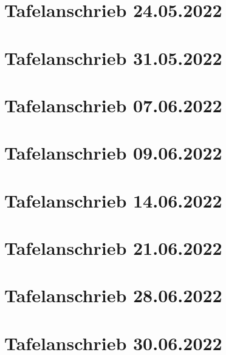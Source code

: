 \documentclass[a4paper,12pt]{article}
\begin{document}
\section{Tafelanschrieb 24.05.2022}

\newpage
\section{Tafelanschrieb 31.05.2022}

\newpage
\section{Tafelanschrieb 07.06.2022}

\newpage
\section{Tafelanschrieb 09.06.2022}

\newpage
\section{Tafelanschrieb 14.06.2022}

\newpage
\section{Tafelanschrieb 21.06.2022}

\newpage
\section{Tafelanschrieb 28.06.2022}

\newpage
\section{Tafelanschrieb 30.06.2022}

\end{document}
